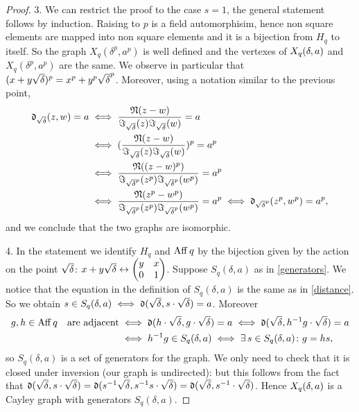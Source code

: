 \begin{theorem}
\begin{proof}
3. We can restrict the proof to the case $s=1$, the general statement follows by induction.
Raising to $p$ is a field automorphisim, hence non square elements are mapped into non square elements 
and it is a bijection from $H_q$ to itself. So the graph $X_q (\delta^{p}, a^{p})$ is well defined and the vertexes of 
$X_q (\delta ,a)$ and $X_q (\delta^{p}, a^{p})$ are the same. We observe in particular that $(x+y\sqrt{\delta})^p=x^p+y^p\sqrt{\delta}^p$.
Moreover, using a notation similar to the previous point,
\begin{align*}
	\operatorname{\mathfrak{d}}_{\sqrt{\delta}} (z,w)=a & \iff \frac{\operatorname{\mathfrak{N}} (z-w)}{\Im_{\sqrt{\delta}} (z) \Im_{\sqrt{\delta}} (w)}=a\\
	& \iff (\frac{\operatorname{\mathfrak{N}} (z-w)}{\Im_{\sqrt{\delta}} (z) \Im_{\sqrt{\delta}} (w)})^p = a^p \\
	& \iff \frac{\operatorname{\mathfrak{N}} ((z-w)^p)}{\Im_{\sqrt{\delta}^p} (z^p) \Im_{\sqrt{\delta}^p} (w^p)}=a^p\\
	& \iff \frac{\operatorname{\mathfrak{N}} (z^p-w^p)}{\Im_{\sqrt{\delta}^p} (z^p) \Im_{\sqrt{\delta}^p} (w^p)}=a^p \iff \operatorname{\mathfrak{d}}_{\sqrt{\delta}^p} (z^p,w^p)=a^p,
\end{align*}
and we conclude that the two graphs are isomorphic.

4. In the statement we identify $H_q$ and $\operatorname{Aff} q$ by the bijection given by the action on the point $\sqrt{\delta}$:
$x+y\sqrt{\delta} \leftrightarrow \begin{pmatrix} y & x \\ 0 & 1 \end{pmatrix}$.
Suppose $S_q(\delta,a)$ as in \ref{generators}. We notice that the equation in the definition of $S_q(\delta,a)$
is the same as in \ref{distance}. So we obtain $s \in S_q(\delta,a) \iff \operatorname{\mathfrak{d}} (\sqrt{\delta}, s \cdot \sqrt{\delta}) = a$. Moreover
\begin{align*}
	g,h \in \operatorname{Aff} q \quad \text{are adjacent} &\iff \operatorname{\mathfrak{d}} (h \cdot \sqrt{\delta}, g \cdot \sqrt{\delta}) = a \iff \operatorname{\mathfrak{d}} ( \sqrt{\delta}, h^{-1}g \cdot \sqrt{\delta}) = a\\
	&\iff h^{-1}g \in S_q(\delta,a) \iff \exists \, s \in S_q(\delta,a)\colon g=hs,
\end{align*}
so $S_q(\delta,a)$ is a set of generators for the graph. We only need to check that it is closed under inversion (our graph is undirected):
but this follows from the fact that $\operatorname{\mathfrak{d}}(\sqrt{\delta}, s\cdot \sqrt{\delta})=\operatorname{\mathfrak{d}}(s^{-1}\sqrt{\delta}, s^{-1}s\cdot \sqrt{\delta})=\operatorname{\mathfrak{d}}(\sqrt{\delta}, s^{-1}\cdot \sqrt{\delta})$.
Hence $X_q (\delta ,a)$ is a Cayley graph with generators $S_q(\delta,a)$.


\end{proof}
\end{theorem}
